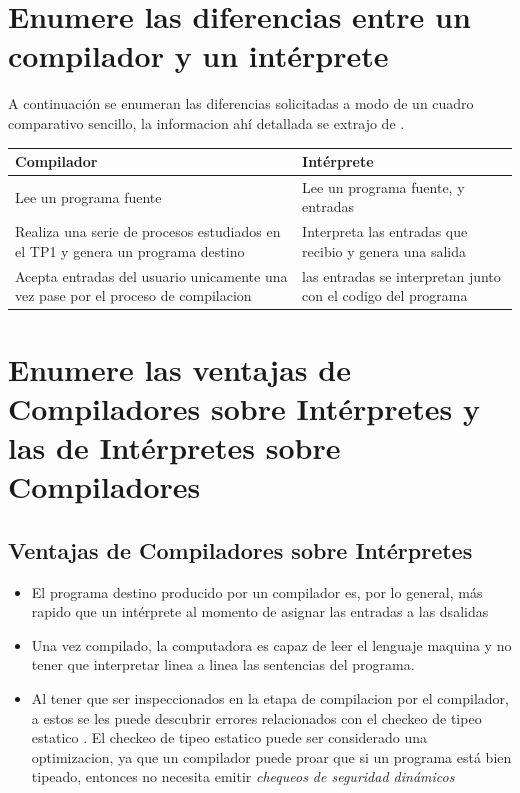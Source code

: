 \documentclass{article}
\begin{document}
\section{Enumere las diferencias entre un compilador y un int\'erprete}
A continuaci\'on se enumeran las diferencias solicitadas a modo de un cuadro comparativo sencillo, la informacion ah\'i detallada se extrajo de \cite{comppth}.

\begin{center}
	\begin{tabular}{||  p{55mm} p{55mm}  ||} 
		\hline
		\textbf{Compilador} & \textbf{Int\'erprete} \\ [0.5ex] 
		\hline\hline
		Lee un programa fuente  & Lee un programa fuente, y entradas \\ \hline
		Realiza una serie de procesos estudiados en el TP1 y genera un programa destino & Interpreta las entradas que recibio y genera una salida \\
		\hline
		Acepta entradas del usuario unicamente una vez pase por el proceso de compilacion & las entradas se interpretan junto con el codigo del programa \\
		\hline
	\end{tabular}
\end{center}


\section{Enumere las ventajas de Compiladores sobre Int\'erpretes y las de Int\'erpretes sobre Compiladores}

\subsection{Ventajas de Compiladores sobre Int\'erpretes} \cite{comppth} \cite{comintp}
\begin{itemize}
\item El programa destino producido por un compilador es, por lo general, m\'as rapido que un int\'erprete al momento de asignar las entradas a las dsalidas
\item Una vez compilado, la computadora es capaz de leer el lenguaje maquina y no tener que interpretar linea a linea las sentencias del programa.
\item Al tener que ser inspeccionados en la etapa de compilacion por el compilador, a estos se les puede descubrir errores relacionados con el checkeo de tipeo estatico \cite{wikistattype}. El checkeo de tipeo estatico puede ser considerado una optimizacion, ya que un compilador puede proar que si un programa est\'a bien tipeado, entonces no necesita emitir \textit{chequeos de seguridad din\'amicos} 
\end{itemize}
\end{document}
